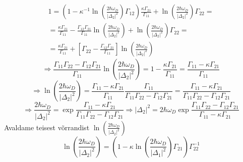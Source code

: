 \documentclass[class=article, crop=false]{standalone}
\begin{document}
\begin{equation}\label{key}
	\begin{split}
		1 = \left( 1 - \kappa^{-1} \ln \left( \frac{2 \hbar \omega_{D}}{ \left| \Delta_{2} \right|^{2}} \right) \Gamma_{12} \right) \frac{ \kappa \Gamma_{21}}{ \Gamma_{11}} + \ln \left( \frac{2 \hbar \omega_{D}}{ \left| \Delta_{2} \right|^{2}} \right) \Gamma_{22} = \\
		= \frac{ \kappa \Gamma_{21}}{ \Gamma_{11}} - \frac{ \Gamma_{12} \Gamma_{21}}{ \Gamma_{11}} \ln \left( \frac{2 \hbar \omega_{D}}{ \left| \Delta_{2} \right|^{2}} \right) + \ln \left( \frac{2 \hbar \omega_{D}}{ \left| \Delta_{2} \right|^{2}} \right) \Gamma_{22} = \\
		= \frac{ \kappa \Gamma_{21}}{ \Gamma_{11}} + \left[ \Gamma_{22} - \frac{ \Gamma_{12} \Gamma_{21}}{ \Gamma_{11}} \right] \ln \left( \frac{2 \hbar \omega_{D}}{ \left| \Delta_{2} \right|^{2}} \right)
	\end{split}
\end{equation}
\begin{equation}\label{key}
	 \Rightarrow \frac{ \Gamma_{11} \Gamma_{22} - \Gamma_{12} \Gamma_{21}}{ \Gamma_{11}} \ln \left( \frac{2 \hbar \omega_{D}}{ \left| \Delta_{2} \right|^{2}} \right) = 1 - \frac{ \kappa \Gamma_{21}}{ \Gamma_{11}} = \frac{ \Gamma_{11} - \kappa \Gamma_{21}}{ \Gamma_{11}}
\end{equation}
\begin{equation}\label{key}
	\Rightarrow \ln \left( \frac{2 \hbar \omega_{D}}{ \left| \Delta_{2} \right|^{2}} \right) = \frac{ \Gamma_{11} - \kappa \Gamma_{21}}{ \Gamma_{11}} \frac{ \Gamma_{11}}{ \Gamma_{11} \Gamma_{22} - \Gamma_{12} \Gamma_{21}} = \frac{ \Gamma_{11} - \kappa \Gamma_{21}}{ \Gamma_{11} \Gamma_{22} - \Gamma_{12} \Gamma_{21}}
\end{equation}
\begin{equation}\label{key}
	\Rightarrow \frac{2 \hbar \omega_{D}}{ \left| \Delta_{2} \right|^{2}} = \exp \frac{ \Gamma_{11} - \kappa \Gamma_{21}}{ \Gamma_{11} \Gamma_{22} - \Gamma_{12} \Gamma_{21}} \Rightarrow \left| \Delta_{2} \right|^{2} = 2 \hbar \omega_{D} \exp \frac{ \Gamma_{11} \Gamma_{22} - \Gamma_{12} \Gamma_{21}}{ \Gamma_{11} - \kappa \Gamma_{21}}
\end{equation}
Avaldame teisest võrrandist $ \ln \left( \frac{2 \hbar \omega_{D}}{ \left| \Delta_{ 2} \right|^{2}} \right) $
\begin{equation}\label{key}
	\ln \left( \frac{2 \hbar \omega_{D}}{ \left| \Delta_{ 2} \right|^{2}} \right) = \left( 1 - \kappa \ln \left( \frac{2 \hbar \omega_{D}}{ \left| \Delta_{ 1} \right|^{2}} \right) \Gamma_{21} \right) \Gamma_{22}^{-1}
\end{equation}
\end{document}
